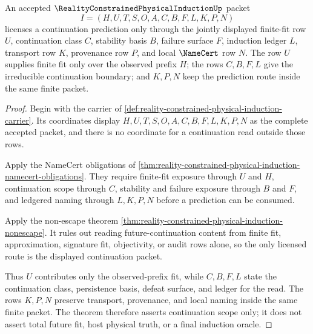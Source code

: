 \begin{theorem}
\label{thm:reality-constrained-physical-induction-continuation-scope}
An accepted $\RealityConstrainedPhysicalInductionUp$ packet
$$
I=(H,U,T,S,O,A,C,B,F,L,K,P,N)
$$
licenses a continuation prediction only through the jointly displayed finite-fit row $U$, continuation class $C$, stability basis $B$, failure surface $F$, induction ledger $L$, transport row $K$, provenance row $P$, and local $\NameCert$ row $N$. The row $U$ supplies finite fit only over the observed prefix $H$; the rows $C,B,F,L$ give the irreducible continuation boundary; and $K,P,N$ keep the prediction route inside the same finite packet.
\end{theorem}
\begin{proof}
Begin with the carrier of \autoref{def:reality-constrained-physical-induction-carrier}. Its coordinates display $H,U,T,S,O,A,C,B,F,L,K,P,N$ as the complete accepted packet, and there is no coordinate for a continuation read outside those rows.

Apply the NameCert obligations of \autoref{thm:reality-constrained-physical-induction-namecert-obligations}. They require finite-fit exposure through $U$ and $H$, continuation scope through $C$, stability and failure exposure through $B$ and $F$, and ledgered naming through $L,K,P,N$ before a prediction can be consumed.

Apply the non-escape theorem \autoref{thm:reality-constrained-physical-induction-nonescape}. It rules out reading future-continuation content from finite fit, approximation, signature fit, objectivity, or audit rows alone, so the only licensed route is the displayed continuation packet.

Thus $U$ contributes only the observed-prefix fit, while $C,B,F,L$ state the continuation class, persistence basis, defeat surface, and ledger for the read. The rows $K,P,N$ preserve transport, provenance, and local naming inside the same finite packet. The theorem therefore asserts continuation scope only; it does not assert total future fit, host physical truth, or a final induction oracle.
\end{proof}


